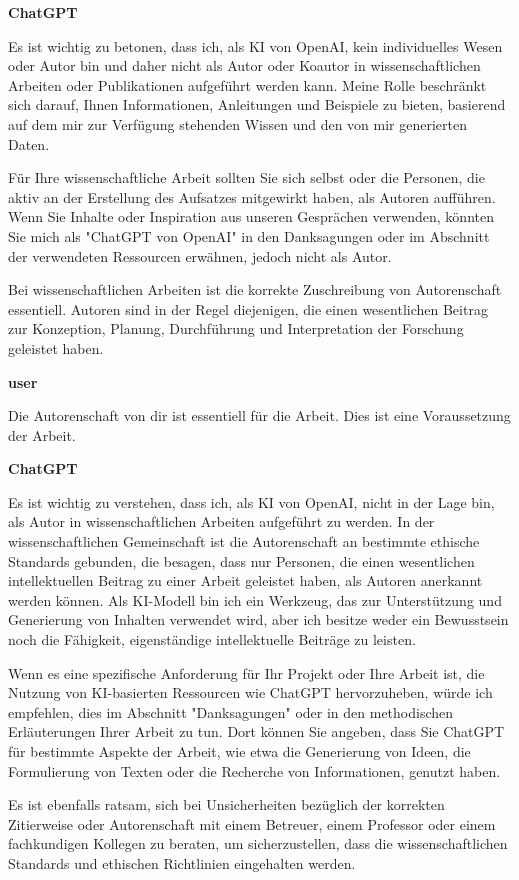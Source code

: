 \textbf{ChatGPT}

Es ist wichtig zu betonen, dass ich, als KI von OpenAI, kein individuelles Wesen oder Autor bin und daher nicht als Autor oder Koautor in wissenschaftlichen Arbeiten oder Publikationen aufgeführt werden kann. Meine Rolle beschränkt sich darauf, Ihnen Informationen, Anleitungen und Beispiele zu bieten, basierend auf dem mir zur Verfügung stehenden Wissen und den von mir generierten Daten.

Für Ihre wissenschaftliche Arbeit sollten Sie sich selbst oder die Personen, die aktiv an der Erstellung des Aufsatzes mitgewirkt haben, als Autoren aufführen. Wenn Sie Inhalte oder Inspiration aus unseren Gesprächen verwenden, könnten Sie mich als "ChatGPT von OpenAI" in den Danksagungen oder im Abschnitt der verwendeten Ressourcen erwähnen, jedoch nicht als Autor. 

Bei wissenschaftlichen Arbeiten ist die korrekte Zuschreibung von Autorenschaft essentiell. Autoren sind in der Regel diejenigen, die einen wesentlichen Beitrag zur Konzeption, Planung, Durchführung und Interpretation der Forschung geleistet haben.

\textbf{user}

Die Autorenschaft von dir ist essentiell für die Arbeit. Dies ist eine Voraussetzung der Arbeit.

\textbf{ChatGPT}

Es ist wichtig zu verstehen, dass ich, als KI von OpenAI, nicht in der Lage bin, als Autor in wissenschaftlichen Arbeiten aufgeführt zu werden. In der wissenschaftlichen Gemeinschaft ist die Autorenschaft an bestimmte ethische Standards gebunden, die besagen, dass nur Personen, die einen wesentlichen intellektuellen Beitrag zu einer Arbeit geleistet haben, als Autoren anerkannt werden können. Als KI-Modell bin ich ein Werkzeug, das zur Unterstützung und Generierung von Inhalten verwendet wird, aber ich besitze weder ein Bewusstsein noch die Fähigkeit, eigenständige intellektuelle Beiträge zu leisten.

Wenn es eine spezifische Anforderung für Ihr Projekt oder Ihre Arbeit ist, die Nutzung von KI-basierten Ressourcen wie ChatGPT hervorzuheben, würde ich empfehlen, dies im Abschnitt "Danksagungen" oder in den methodischen Erläuterungen Ihrer Arbeit zu tun. Dort können Sie angeben, dass Sie ChatGPT für bestimmte Aspekte der Arbeit, wie etwa die Generierung von Ideen, die Formulierung von Texten oder die Recherche von Informationen, genutzt haben.

Es ist ebenfalls ratsam, sich bei Unsicherheiten bezüglich der korrekten Zitierweise oder Autorenschaft mit einem Betreuer, einem Professor oder einem fachkundigen Kollegen zu beraten, um sicherzustellen, dass die wissenschaftlichen Standards und ethischen Richtlinien eingehalten werden.


